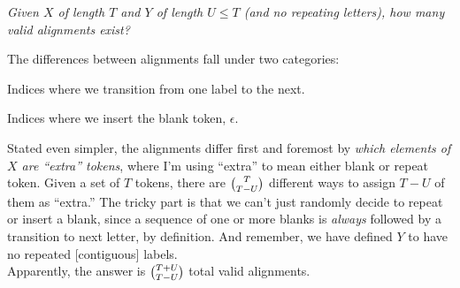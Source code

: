 \documentclass[11pt]{article}
\begin{document}
\begin{example}
	{\itshape\small Given $X$ of length $T$ and $Y$ of length $U \le T$ (and no repeating letters), how many valid alignments exist?}
	\tcblower
	
	The differences between alignments fall under two categories:
	\begin{compactenum}
		\item Indices where we transition from one label to the next. 
		\item Indices where we insert the blank token, $\epsilon$. 
	\end{compactenum}
	\vspace{1em}
	
	Stated even simpler, the alignments differ first and foremost by \textit{which elements of $X$ are ``extra'' tokens}, where I'm using ``extra'' to mean either blank or repeat token. Given a set of $T$ tokens, there are $\tbinom{T}{T - U}$ different ways to assign $T - U$ of them as ``extra.'' The tricky part is that we can't just randomly decide to repeat or insert a blank, since a sequence of one or more blanks is \textit{always} followed by a transition to next letter, by definition. And remember, we have defined $Y$ to have no repeated [contiguous] labels. \\
	
	Apparently, the answer is $\tbinom{T + U}{ T - U}$ total valid alignments. 
\end{example}
\end{document}
